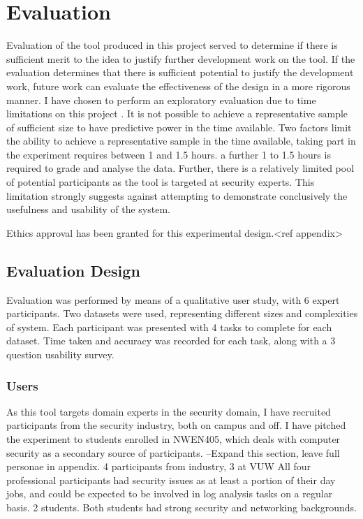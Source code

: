 \chapter{Evaluation}\label{eval}

Evaluation of the tool produced in this project served to determine if there is sufficient merit to the idea to justify further development work on the tool. If the evaluation determines that there is sufficient potential to justify the development work, future work can evaluate the effectiveness of the design in a more rigorous manner. I have chosen to perform an exploratory evaluation due to time limitations on this project \cite{Ellis:2006:EAU:1168149.1168152}. It is not possible to achieve a representative sample of sufficient size to have predictive power in the time available. Two factors limit the ability to achieve a representative sample in the time available, taking part in the experiment requires between 1 and 1.5 hours. a further 1 to 1.5 hours is required to grade and analyse the data. Further, there is a relatively limited pool of potential participants as the tool is targeted at security experts. This limitation strongly suggests against attempting to demonstrate conclusively the usefulness and usability of the system. 

Ethics approval has been granted for this experimental design.<ref appendix>

\section{Evaluation Design}

Evaluation was performed by means of a qualitative user study, with 6 expert participants. Two datasets were used, representing different sizes and complexities of system. Each participant was presented with 4 tasks to complete for each dataset. Time taken and accuracy was recorded for each task, along with a 3 question usability survey. 

\subsection{Users}

As this tool targets domain experts in the security domain, I have recruited participants from the security industry, both on campus and off. I have pitched the experiment to students enrolled in NWEN405, which deals with computer security as a secondary source of participants.
--Expand this section, leave full personae in appendix.
4 participants from industry, 3 at VUW
All four professional participants had security issues as at least a portion of their day jobs, and could be expected to be involved in log analysis tasks on a regular basis.
2 students.  Both students had strong security and networking backgrounds.

